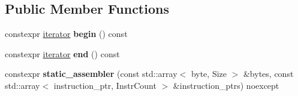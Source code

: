 \subsection*{Public Member Functions}
\begin{DoxyCompactItemize}
\item 
\mbox{\label{classdistant_1_1assembly_1_1static__assembler_ada840b6ad572d0d5786826ba9b3531d0}} 
constexpr \mbox{\hyperlink{classdistant_1_1assembly_1_1static__assembler__iterator}{iterator}} {\bfseries begin} () const
\item 
\mbox{\label{classdistant_1_1assembly_1_1static__assembler_a0354fc20fba2022df2a0346698fe7605}} 
constexpr \mbox{\hyperlink{classdistant_1_1assembly_1_1static__assembler__iterator}{iterator}} {\bfseries end} () const
\item 
\mbox{\label{classdistant_1_1assembly_1_1static__assembler_a26df9749ddfd9040b7def347ba50435c}} 
constexpr {\bfseries static\+\_\+assembler} (const std\+::array$<$ byte, Size $>$ \&bytes, const std\+::array$<$ instruction\+\_\+ptr, Instr\+Count $>$ \&instruction\+\_\+ptrs) noexcept
\end{DoxyCompactItemize}
